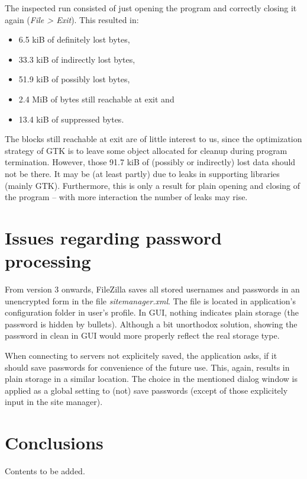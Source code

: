 \documentclass[11pt]{article}
\begin{document}
The inspected run consisted of just opening the program and correctly closing it again (\textit{File > Exit}). This resulted in:
\begin{itemize}[topsep=0pt, itemsep=0pt]
\item 6.5 kiB of definitely lost bytes,
\item 33.3 kiB of indirectly lost bytes,
\item 51.9 kiB of possibly lost bytes,
\item 2.4 MiB of bytes still reachable at exit and
\item 13.4 kiB of suppressed bytes.
\end{itemize}
\noindent
The blocks still reachable at exit are of little interest to us, since the optimization strategy of GTK is to leave some object allocated for cleanup during program termination. However, those 91.7 kiB of (possibly or indirectly) lost data should not be there. It may be (at least partly) due to leaks in supporting libraries (mainly GTK). Furthermore, this is only a result for plain opening and closing of the program -- with more interaction the number of leaks may rise.

\section{Issues regarding password processing}

From version 3 onwards, FileZilla saves all stored usernames and passwords in an unencrypted form in the file \textit{sitemanager.xml}. The file is located in application's configuration folder in user's profile. In GUI, nothing indicates plain storage (the password is hidden by bullets). Although a bit unorthodox solution, showing the password in clean in GUI would more properly reflect the real storage type.

When connecting to servers not explicitely saved, the application asks, if it should save passwords for convenience of the future use. This, again, results in plain storage in a similar location. The choice in the mentioned dialog window is applied as a global setting to (not) save passwords (except of those explicitely input in the site manager).

\section{Conclusions}

Contents to be added.
\end{document}
